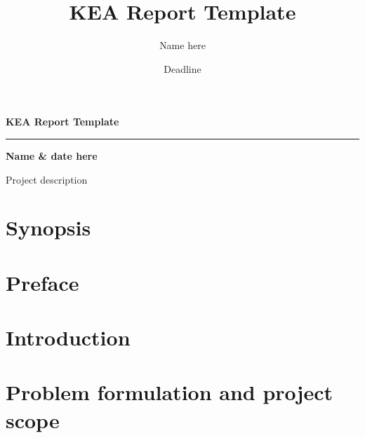 \documentclass{report}
\title{KEA Report Template}
\author{Name here}
\date{Deadline}
\begin{document}
  \maketitle
  \clearpage
  
   \begin{center}
        \vspace*{5cm}
        
        \textbf{KEA Report Template}
        
        \vfill
        \hrule
        \vspace{0.5cm}
        \textbf{Name \& date  here}
        
        \vspace{5cm}
     \end{center}

  \begin{chapter}{Project description}
      \section{Synopsis}
      \lipsum[2-4]
      \clearpage

      \tableofcontents
      \clearpage

      \section{Preface}
      \lipsum[1-5]
      \clearpage

      \section{Introduction}
      \lipsum[3-5]
      \clearpage

      \section{Problem formulation and project scope}
      \lipsum[3-5]
      \clearpage
  \end{chapter}
\end{document}

